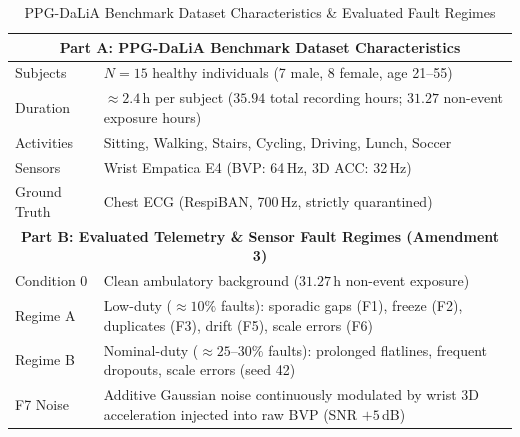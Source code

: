 \begin{table}[t]
\caption{PPG-DaLiA Benchmark Dataset Characteristics \& Evaluated Fault Regimes}
\label{tab:dataset_and_faults}
\centering
\footnotesize
\renewcommand{\arraystretch}{0.95}
\setlength{\tabcolsep}{2.5pt}
\begin{tabular}{|p{2.0cm}|p{6.0cm}|}
\hline
\multicolumn{2}{|c|}{\textbf{Part A: PPG-DaLiA Benchmark Dataset Characteristics \cite{ref_reiss_dalia}}} \\
\hline
Subjects & $N = 15$ healthy individuals (7 male, 8 female, age 21--55) \\
Duration & $\approx 2.4$\,h per subject ($35.94$ total recording hours; $31.27$ non-event exposure hours) \\
Activities & Sitting, Walking, Stairs, Cycling, Driving, Lunch, Soccer \\
Sensors & Wrist Empatica E4 (BVP: 64\,Hz, 3D ACC: 32\,Hz) \\
Ground Truth & Chest ECG (RespiBAN, 700\,Hz, strictly quarantined) \\
\hline
\multicolumn{2}{|c|}{\textbf{Part B: Evaluated Telemetry \& Sensor Fault Regimes (Amendment 3)}} \\
\hline
Condition 0 & Clean ambulatory background ($31.27$\,h non-event exposure) \\
Regime A & Low-duty ($\approx 10\%$ faults): sporadic gaps (F1), freeze (F2), duplicates (F3), drift (F5), scale errors (F6) \\
Regime B & Nominal-duty ($\approx 25\text{--}30\%$ faults): prolonged flatlines, frequent dropouts, scale errors (seed 42) \\
F7 Noise & Additive Gaussian noise continuously modulated by wrist 3D acceleration injected into raw BVP (SNR $+5$\,dB) \\
\hline
\end{tabular}
\end{table}
